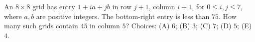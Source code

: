 An $8\times8$ grid has entry $1+ia+jb$ in row $j+1$, column $i+1$, for $0\le i,j\le7$, where $a,b$ are positive integers. The bottom-right entry is less than $75$. How many such grids contain $45$ in column $5$? Choices: (A) $6$; (B) $3$; (C) $7$; (D) $5$; (E) $4$.
